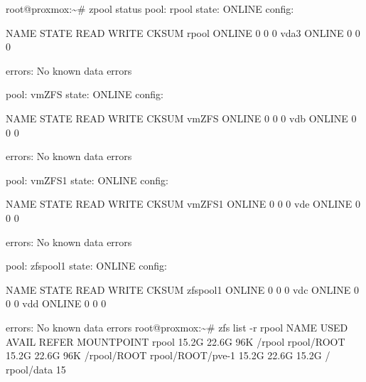 \documentclass[
  10pt,
]{krantz}
\newenvironment{Shaded}{\begin{snugshade}}{\end{snugshade}}
\newcommand{\AttributeTok}[1]{\textcolor[rgb]{0.77,0.63,0.00}{#1}}
\newcommand{\ExtensionTok}[1]{#1}
\newcommand{\NormalTok}[1]{#1}
\begin{document}
\begin{Shaded}
\begin{Highlighting}[]
\ExtensionTok{root@proxmox:\textasciitilde{}\#}\NormalTok{ zpool status}
  \ExtensionTok{pool:}\NormalTok{ rpool}
 \ExtensionTok{state:}\NormalTok{ ONLINE}
\ExtensionTok{config:}

        \ExtensionTok{NAME}\NormalTok{        STATE     READ WRITE CKSUM}
        \ExtensionTok{rpool}\NormalTok{       ONLINE       0     0     0}
          \ExtensionTok{vda3}\NormalTok{      ONLINE       0     0     0}

\ExtensionTok{errors:}\NormalTok{ No known data errors}

  \ExtensionTok{pool:}\NormalTok{ vmZFS}
 \ExtensionTok{state:}\NormalTok{ ONLINE}
\ExtensionTok{config:}

        \ExtensionTok{NAME}\NormalTok{        STATE     READ WRITE CKSUM}
        \ExtensionTok{vmZFS}\NormalTok{       ONLINE       0     0     0}
          \ExtensionTok{vdb}\NormalTok{       ONLINE       0     0     0}

\ExtensionTok{errors:}\NormalTok{ No known data errors}

  \ExtensionTok{pool:}\NormalTok{ vmZFS1}
 \ExtensionTok{state:}\NormalTok{ ONLINE}
\ExtensionTok{config:}

        \ExtensionTok{NAME}\NormalTok{        STATE     READ WRITE CKSUM}
        \ExtensionTok{vmZFS1}\NormalTok{      ONLINE       0     0     0}
          \ExtensionTok{vde}\NormalTok{       ONLINE       0     0     0}

\ExtensionTok{errors:}\NormalTok{ No known data errors}

  \ExtensionTok{pool:}\NormalTok{ zfspool1}
 \ExtensionTok{state:}\NormalTok{ ONLINE}
\ExtensionTok{config:}

        \ExtensionTok{NAME}\NormalTok{        STATE     READ WRITE CKSUM}
        \ExtensionTok{zfspool1}\NormalTok{    ONLINE       0     0     0}
          \ExtensionTok{vdc}\NormalTok{       ONLINE       0     0     0}
          \ExtensionTok{vdd}\NormalTok{       ONLINE       0     0     0}

\ExtensionTok{errors:}\NormalTok{ No known data errors}
\ExtensionTok{root@proxmox:\textasciitilde{}\#}\NormalTok{ zfs list }\AttributeTok{{-}r}\NormalTok{ rpool}
\ExtensionTok{NAME}\NormalTok{               USED  AVAIL     REFER  MOUNTPOINT}
\ExtensionTok{rpool}\NormalTok{             15.2G  22.6G       96K  /rpool}
\ExtensionTok{rpool/ROOT}\NormalTok{        15.2G  22.6G       96K  /rpool/ROOT}
\ExtensionTok{rpool/ROOT/pve{-}1}\NormalTok{  15.2G  22.6G     15.2G  /}
\ExtensionTok{rpool/data}\NormalTok{         15}
\end{Highlighting}
\end{Shaded}
\end{document}
